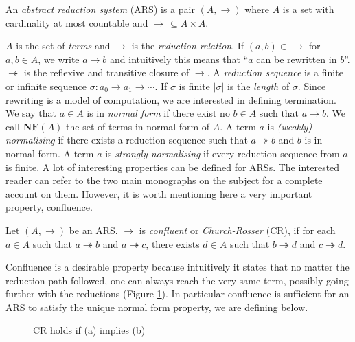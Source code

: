 \begin{definition}
	An \emph{abstract reduction system} (ARS) is a pair $(A,\rightarrow)$ where $A$ is a set with cardinality at most countable and $\rightarrow\,\subseteq A\times A$.
\end{definition}
$A$ is the set of \emph{terms} and $\rightarrow$ is the \emph{reduction relation}. If $(a,b)\in\,\rightarrow$ for $a,b\in A$, we write $a\rightarrow b$ and intuitively this means that ``$a$ can be rewritten in $b$''. $\twoheadrightarrow$ is the reflexive and transitive closure of $\rightarrow$. A \emph{reduction sequence} is a finite or infinite sequence $\sigma:a_0\rightarrow a_1\rightarrow\cdots$. If $\sigma$ is finite $|\sigma|$ is the \emph{length} of $\sigma$. Since rewriting is a model of computation, we are interested in defining termination. We say that $a\in A$ is in \emph{normal form} if there exist no $b\in A$ such that $a\rightarrow b$. We call $\mathbf{NF}(A)$ the set of terms in normal form of $A$. A term $a$ is \emph{(weakly) normalising} if there exists a reduction sequence such that $a\twoheadrightarrow b$ and $b$ is in normal form. A term $a$ is \emph{strongly normalising} if every reduction sequence from $a$ is finite.  A lot of interesting properties can be defined for ARSs. The interested reader can refer to the two main monographs on the subject \cite{terese_term_2003,baader_term_1999} for a complete account on them. However, it is worth mentioning here a very important property, confluence.
\begin{definition}
	Let $(A,\rightarrow)$ be an ARS. $\rightarrow$ is \emph{confluent} or \emph{Church-Rosser} (CR), if for each $a\in A$ such that $a\twoheadrightarrow b$ and $a\twoheadrightarrow c$, there exists $d\in A$ such that $b\twoheadrightarrow d$ and $c\twoheadrightarrow d$.
\end{definition}
Confluence is a desirable property because intuitively it states that no matter the reduction path followed, one can always reach the very same term, possibly going further with the reductions (Figure \ref{figure:confluence}). In particular confluence is sufficient for an ARS to satisfy the unique normal form property, we are defining below.
\begin{figure}
	\centering
	\qquad
	\caption{CR holds if (a) implies (b)}
	\label{figure:confluence}
\end{figure}
